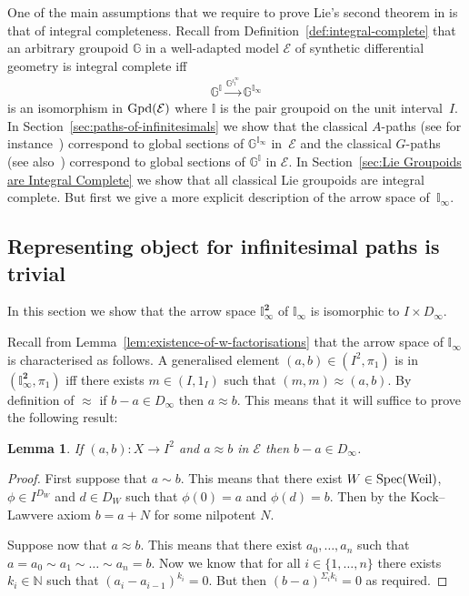 \documentclass[10pt,a4paper]{amsart}
\numberwithin{equation}{section}
\newtheorem{Lemma}[Theorem]{Lemma}
\begin{document}
One of the main assumptions that we require to prove Lie's second theorem in \cite{burke-relative-to-local-models} is that of integral completeness.
Recall from Def\/inition~\ref{def:integral-complete} that an arbitrary groupoid $\mathbb{G}$ in a well-adapted model $\mathcal{E}$ of synthetic dif\/ferential geometry is integral complete if\/f
\begin{gather*}\mathbb{G}^{\mathbb{I}} \xrightarrow{\mathbb{G}^{\iota_{\mathbb{I}}^{\infty}}} \mathbb{G}^{\mathbb{I}_{\infty}}\end{gather*}
is an isomorphism in ${\rm Gpd}(\mathcal{E})$ where $\mathbb{I}$ is the pair groupoid on the unit interval~$I$. In Section~\ref{sec:paths-of-infinitesimals} we show that the classical $A$-paths (see for instance~\cite{2000JACKolkandJJDuistermaat44}) correspond to global sections of $\mathbb{G}^{\mathbb{I}_{\infty}}$ in~$\mathcal{E}$ and the classical $G$-paths (see also~\cite{2000JACKolkandJJDuistermaat44}) correspond to global sections of $\mathbb{G}^{\mathbb{I}}$ in $\mathcal{E}$. In Section~\ref{sec:Lie Groupoids are Integral Complete} we show that all classical Lie groupoids are integral complete. But f\/irst we give a more explicit description of the arrow space of~$\mathbb{I}_{\infty}$.

\subsection{Representing object for inf\/initesimal paths is trivial}\label{sec:arrow-space-of-A-paths}

In this section we show that the arrow space $\mathbb{I}_{\infty}^{\mathbf 2}$ of $\mathbb{I}_{\infty}$ is isomorphic to $I\times D_{\infty}$.

Recall from Lemma~\ref{lem:existence-of-w-factorisations} that the arrow space of $\mathbb{I}_{\infty}$ is characterised as follows. A generalised element $(a,b)\in (I^2,\pi_1)$ is in $(\mathbb{I}_{\infty}^{\mathbf 2},\pi_1)$ if\/f there exists $m\in (I,1_I)$ such that $(m,m)\approx (a,b)$. By def\/inition of $\approx$ if $b-a\in D_{\infty}$ then $a\approx b$. This means that it will suf\/f\/ice to prove the following result:
\begin{Lemma}\label{lem:b-a-nilpotent}
 If $(a,b)\colon X \rightarrow I^2$ and $a\approx b$ in $\mathcal{E}$ then $b-a\in D_{\infty}$.
\end{Lemma}
\begin{proof}
First suppose that $a\sim b$. This means that there exist $W\in {\rm Spec}({\rm Weil})$, $\phi\in I^{D_W}$ and $d\in D_W$ such that $\phi(0)=a$ and $\phi(d)=b$. Then by the Kock--Lawvere axiom $b=a+N$ for some nilpotent $N$.

Suppose now that $a\approx b$. This means that there exist $a_0,\dots ,a_n$ such that $a=a_0\sim a_1\sim \dots \sim a_n=b$. Now we know that for all $i\in\{1,\dots ,n\}$ there exists $k_i\in\mathbb{N}$ such that $(a_i-a_{i-1})^{k_i}=0$. But then $(b-a)^{\Sigma_i k_i}=0$ as required.
\end{proof}
\end{document}
